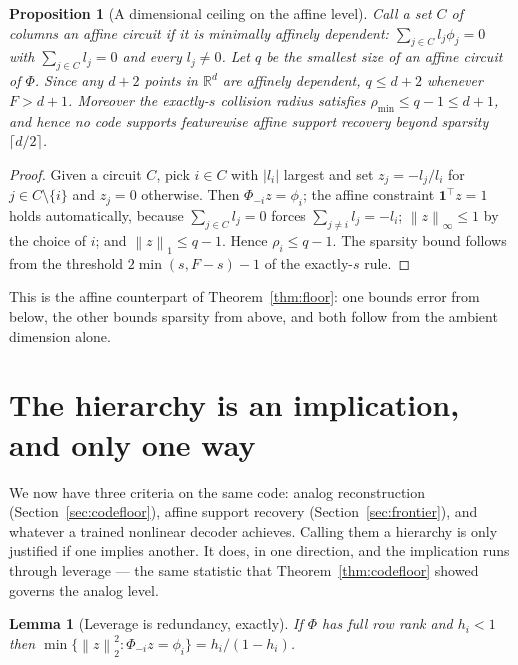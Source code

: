 \documentclass[preprint,12pt]{elsarticle}
\newtheorem{lemma}[theorem]{Lemma}
\newtheorem{proposition}[theorem]{Proposition}
\theoremstyle{definition}
\newcommand{\R}{\mathbb{R}}
\newcommand{\norm}[1]{\left\lVert #1 \right\rVert}
\begin{document}
\begin{proposition}[A dimensional ceiling on the affine level]
\label{prop:circuit}
Call a set $C$ of columns an \emph{affine circuit} if it is minimally affinely dependent:
$\sum_{j\in C}l_j\phi_j=0$ with $\sum_{j\in C}l_j=0$ and every $l_j\neq0$. Let $q$ be the
smallest size of an affine circuit of $\Phi$. Since any $d+2$ points in $\R^d$ are affinely
dependent, $q\le d+2$ whenever $F>d+1$. Moreover the exactly-$s$ collision radius satisfies
$\rho_{\min}\le q-1\le d+1$, and hence no code supports featurewise affine support recovery
beyond sparsity $\lceil d/2\rceil$.
\end{proposition}

\begin{proof}
Given a circuit $C$, pick $i\in C$ with $|l_i|$ largest and set $z_j=-l_j/l_i$ for
$j\in C\setminus\{i\}$ and $z_j=0$ otherwise. Then $\Phi_{-i}z=\phi_i$; the affine constraint
$\mathbf 1^{\top}z=1$ holds automatically, because $\sum_{j\in C}l_j=0$ forces
$\sum_{j\neq i}l_j=-l_i$; $\norm{z}_\infty\le1$ by the choice of $i$; and
$\norm{z}_1\le q-1$. Hence $\rho_i\le q-1$. The sparsity bound follows from the threshold
$2\min(s,F-s)-1$ of the exactly-$s$ rule.
\end{proof}

This is the affine counterpart of Theorem~\ref{thm:floor}: one bounds error from below, the other
bounds sparsity from above, and both follow from the ambient dimension alone.

\section{The hierarchy is an implication, and only one way}
\label{sec:hierarchy}

We now have three criteria on the same code: analog reconstruction
(Section~\ref{sec:codefloor}), affine support recovery (Section~\ref{sec:frontier}), and whatever
a trained nonlinear decoder achieves. Calling them a hierarchy is only justified if one implies
another. It does, in one direction, and the implication runs through leverage --- the same
statistic that Theorem~\ref{thm:codefloor} showed governs the analog level.

\begin{lemma}[Leverage is redundancy, exactly]
\label{lem:sm}
If $\Phi$ has full row rank and $h_i<1$ then
$\min\{\norm{z}_2^2:\Phi_{-i}z=\phi_i\}=h_i/(1-h_i)$.
\end{lemma}
\end{document}

